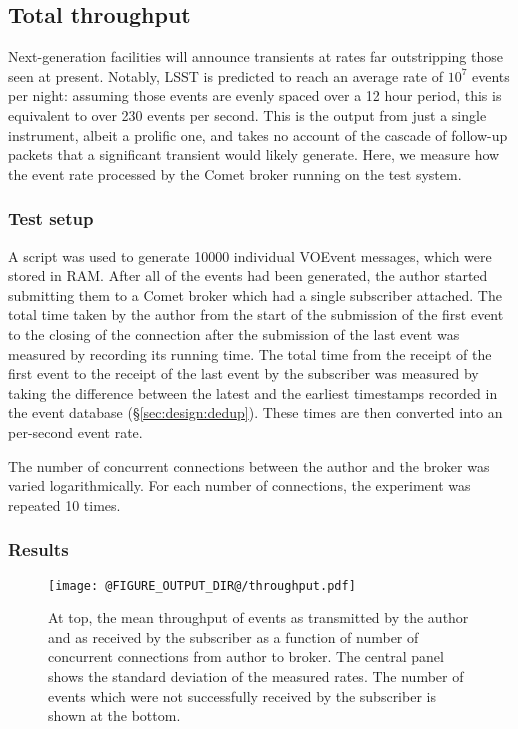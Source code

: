 \documentclass[5p,authoryear]{elsarticle}
\begin{document}
\subsection{Total throughput}
\label{sec:perf:total}

Next-generation facilities will announce transients at rates far outstripping
those seen at present. Notably, LSST is predicted to reach an average rate of
$10^7$ events per night: assuming those events are evenly spaced over a 12
hour period, this is equivalent to over 230 events per second. This is the
output from just a single instrument, albeit a prolific one, and takes no
account of the cascade of follow-up packets that a significant transient would
likely generate. Here, we measure how the event rate processed by the Comet
broker running on the test system.

\subsubsection{Test setup}
\label{sec:perf:total:setup}

A script was used to generate 10000 individual VOEvent messages, which were
stored in RAM. After all of the events had been generated, the author started
submitting them to a Comet broker which had a single subscriber attached. The
total time taken by the author from the start of the submission of the first
event to the closing of the connection after the submission of the last event
was measured by recording its running time. The total time from the receipt of
the first event to the receipt of the last event by the subscriber was
measured by taking the difference between the latest and the earliest
timestamps recorded in the event database (\S\ref{sec:design:dedup}). These
times are then converted into an per-second event rate.

The number of concurrent connections between the author and the broker was
varied logarithmically. For each number of connections, the experiment was
repeated 10 times.

\subsubsection{Results}
\label{sec:perf:total:results}

\begin{figure}
  \begin{center}
  \texttt{[image: @FIGURE\_OUTPUT\_DIR@/throughput.pdf]}
  \end{center}

  \caption{At top, the mean throughput of events as transmitted by
  the author and as received by the subscriber as a function of number of
  concurrent connections from author to broker. The central panel shows the
  standard deviation of the measured rates. The number of events which were
  not successfully received by the subscriber is shown at the bottom.}

  \label{fig:throughput}
\end{figure}
\end{document}

